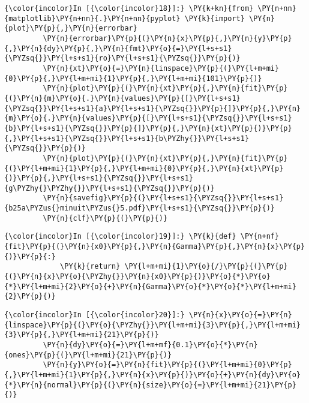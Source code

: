     \begin{Verbatim}[commandchars=\\\{\}]
{\color{incolor}In [{\color{incolor}18}]:} \PY{k+kn}{from} \PY{n+nn}{matplotlib}\PY{n+nn}{.}\PY{n+nn}{pyplot} \PY{k}{import} \PY{n}{plot}\PY{p}{,}\PY{n}{errorbar}
         \PY{n}{errorbar}\PY{p}{(}\PY{n}{x}\PY{p}{,}\PY{n}{y}\PY{p}{,}\PY{n}{dy}\PY{p}{,}\PY{n}{fmt}\PY{o}{=}\PY{l+s+s1}{\PYZsq{}}\PY{l+s+s1}{ro}\PY{l+s+s1}{\PYZsq{}}\PY{p}{)}
         \PY{n}{xt}\PY{o}{=}\PY{n}{linspace}\PY{p}{(}\PY{l+m+mi}{0}\PY{p}{,}\PY{l+m+mi}{1}\PY{p}{,}\PY{l+m+mi}{101}\PY{p}{)}
         \PY{n}{plot}\PY{p}{(}\PY{n}{xt}\PY{p}{,}\PY{n}{fit}\PY{p}{(}\PY{n}{m}\PY{o}{.}\PY{n}{values}\PY{p}{[}\PY{l+s+s1}{\PYZsq{}}\PY{l+s+s1}{a}\PY{l+s+s1}{\PYZsq{}}\PY{p}{]}\PY{p}{,}\PY{n}{m}\PY{o}{.}\PY{n}{values}\PY{p}{[}\PY{l+s+s1}{\PYZsq{}}\PY{l+s+s1}{b}\PY{l+s+s1}{\PYZsq{}}\PY{p}{]}\PY{p}{,}\PY{n}{xt}\PY{p}{)}\PY{p}{,}\PY{l+s+s1}{\PYZsq{}}\PY{l+s+s1}{b\PYZhy{}}\PY{l+s+s1}{\PYZsq{}}\PY{p}{)}
         \PY{n}{plot}\PY{p}{(}\PY{n}{xt}\PY{p}{,}\PY{n}{fit}\PY{p}{(}\PY{l+m+mi}{1}\PY{p}{,}\PY{l+m+mi}{0}\PY{p}{,}\PY{n}{xt}\PY{p}{)}\PY{p}{,}\PY{l+s+s1}{\PYZsq{}}\PY{l+s+s1}{g\PYZhy{}\PYZhy{}}\PY{l+s+s1}{\PYZsq{}}\PY{p}{)}
         \PY{n}{savefig}\PY{p}{(}\PY{l+s+s1}{\PYZsq{}}\PY{l+s+s1}{b25a\PYZus{}minuit\PYZus{}5.pdf}\PY{l+s+s1}{\PYZsq{}}\PY{p}{)}
         \PY{n}{clf}\PY{p}{(}\PY{p}{)}
\end{Verbatim}


    \begin{Verbatim}[commandchars=\\\{\}]
{\color{incolor}In [{\color{incolor}19}]:} \PY{k}{def} \PY{n+nf}{fit}\PY{p}{(}\PY{n}{x0}\PY{p}{,}\PY{n}{Gamma}\PY{p}{,}\PY{n}{x}\PY{p}{)}\PY{p}{:}
             \PY{k}{return} \PY{l+m+mi}{1}\PY{o}{/}\PY{p}{(}\PY{p}{(}\PY{n}{x}\PY{o}{\PYZhy{}}\PY{n}{x0}\PY{p}{)}\PY{o}{*}\PY{o}{*}\PY{l+m+mi}{2}\PY{o}{+}\PY{n}{Gamma}\PY{o}{*}\PY{o}{*}\PY{l+m+mi}{2}\PY{p}{)}
\end{Verbatim}


    \begin{Verbatim}[commandchars=\\\{\}]
{\color{incolor}In [{\color{incolor}20}]:} \PY{n}{x}\PY{o}{=}\PY{n}{linspace}\PY{p}{(}\PY{o}{\PYZhy{}}\PY{l+m+mi}{3}\PY{p}{,}\PY{l+m+mi}{3}\PY{p}{,}\PY{l+m+mi}{21}\PY{p}{)}
         \PY{n}{dy}\PY{o}{=}\PY{l+m+mf}{0.1}\PY{o}{*}\PY{n}{ones}\PY{p}{(}\PY{l+m+mi}{21}\PY{p}{)}
         \PY{n}{y}\PY{o}{=}\PY{n}{fit}\PY{p}{(}\PY{l+m+mi}{0}\PY{p}{,}\PY{l+m+mi}{1}\PY{p}{,}\PY{n}{x}\PY{p}{)}\PY{o}{+}\PY{n}{dy}\PY{o}{*}\PY{n}{normal}\PY{p}{(}\PY{n}{size}\PY{o}{=}\PY{l+m+mi}{21}\PY{p}{)}
\end{Verbatim}


